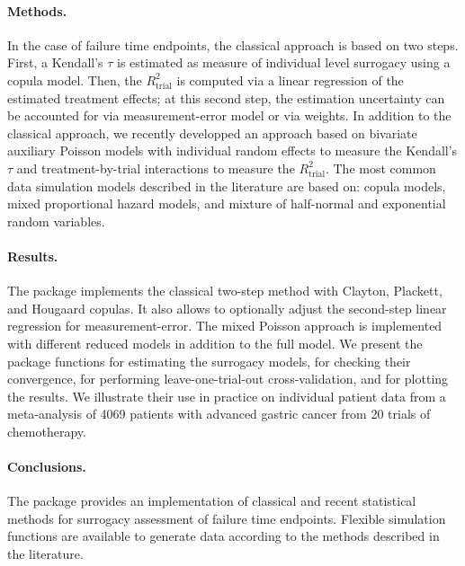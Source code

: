 \documentclass[]{scrartcl}\usepackage[]{graphicx}\usepackage[]{color}
\begin{document}
{  \paragraph{Methods.}
  In the case of failure time endpoints,
    the classical approach is based on two steps.
  First,  a Kendall's $\tau$ is estimated as measure of individual level surrogacy
    using a copula model.
  Then, the $R^2_\text{trial}$ is computed via a linear regression of the estimated treatment effects;
    at this second step, the estimation uncertainty can be accounted for
    via measurement-error model or via weights.
  In addition to the classical approach,
    we recently developped an approach based on bivariate 
    auxiliary Poisson models with
    individual random effects to measure the Kendall's $\tau$ and
    treatment-by-trial interactions to measure the $R^2_\text{trial}$.
  The most common data simulation models described in the literature
    are based on: copula models,
    mixed proportional hazard models, and 
    mixture of half-normal and exponential random variables.
  \paragraph{Results.}
  The  package  implements
    the classical two-step method with Clayton, Plackett, and Hougaard copulas.
  It also allows to optionally adjust the second-step linear regression 
    for measurement-error.
  The mixed Poisson approach is implemented 
    with different reduced models in addition to the full model.
  We present the package functions for estimating the surrogacy models,
    for checking their convergence, 
    for performing leave-one-trial-out cross-validation,
    and for plotting the results.
  We illustrate their use in practice
    on individual patient data from a meta-analysis of 4069 patients with advanced
    gastric cancer from 20 trials of chemotherapy.
  \paragraph{Conclusions.}
  The  package provides an  implementation of
  classical and recent statistical methods for surrogacy assessment
    of failure time endpoints.
  Flexible simulation functions are available
    to generate data according to the methods described in the literature.
  
\linenumbers




}
\end{document}
